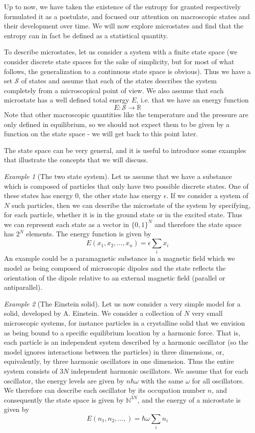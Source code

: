 \documentclass[a4paper, draft]{report}
\numberwithin{section}{chapter}
\numberwithin{equation}{chapter}
\theoremstyle{own}
\theoremstyle{remark}
\newtheorem{example}{Example}[section]
\newcommand{\R}{\mathbb{R}}
\newcommand{\N}{\mathbb{N}}
\begin{document}
Up to now, we have taken the existence of the entropy for granted respectively formulated it as a postulate, and focused our attention on macroscopic states and their development over time. We will now explore microstates and find that the entropy can in fact be defined as a statistical quantity. 

To describe microstates, let us consider a system with a finite state space (we consider discrete state spaces for the sake of simplicity, but for most of what follows, the generalization to a continuous state space is obvious). Thus we have a set
${\mathcal S}$ of states and assume that each of the states describes the system completely from a microscopical point of view. We also assume that each microstate has a well defined total energy $E$, i.e. that we have an energy function 
$$
E \colon {\mathcal S} \rightarrow \R
$$
Note that other macroscopic quantities like the temperature and the pressure are only defined in equilibrium, so we should not expect them to be given by a function on the state space - we will get back to this point later.

The state space can be very general, and it is useful to introduce some examples that illustrate the concepts that we will discuss.

\begin{example}[The two state system]
Let us assume that we have a substance which is composed of particles that only have two possible discrete states. One of these states has energy 0, the other state has energy $\epsilon$. If we consider a system of $N$ such particles, then we can describe the microstate of the system by specifying, for each particle, whether it is in the ground state or in the excited state. Thus we can represent each state as a vector in $\{0,1\}^N$ and therefore the state space has $2^N$ elements. The energy function is given by
$$
E(x_1, x_2, \dots, x_n) = \epsilon\sum_i x_i
$$
An example could be a paramagnetic substance in a magnetic field which we model as being composed of microscopic dipoles and the state reflects the orientation of the dipole relative to an external magnetic field (parallel or antiparallel).
\end{example}

\begin{example}[The Einstein solid]
Let us now consider a very simple model for a solid, developed by A. Einstein. We consider a collection of $N$ very small microscopic systems, for instance particles in a crystalline solid that we envision as being bound to a specific equilibrium location by a harmonic force. That is, each particle is an independent system described by a harmonic oscillator (so the model ignores interactions between the particles) in three dimensions, or, equivalently, by three harmonic oscillators in one dimension. Thus the entire system consists of $3N$ independent harmonic oscillators. We assume that for each oscillator, the energy levels are given by $n \hbar \omega$ with the same $\omega$ for all oscillators. We therefore can describe each oscillator by its occupation number $n$, and consequently the state space is given by ${\N}^{3N}$, and the energy of a microstate is given by
$$
E(n_1, n_2, \dots, ) = \hbar \omega \sum_i n_i
$$
\end{example}
\end{document}
